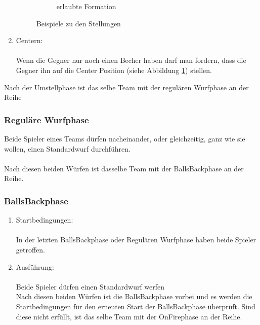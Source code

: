 \documentclass[a5paper, 12pt]{book}
\begin{document}
\begin{enumerate}[(1)]
\begin{figure}[h!]
\begin{subfigure}[b]{0.434\textwidth}
         \caption{erlaubte Formation}
     \end{subfigure}
        \caption{Beispiele zu den Stellungen}
        \label{fig:three graphs}
\end{figure}
\item
    Centern: \\\\
    Wenn die Gegner nur noch einen Becher haben darf man fordern, dass die Gegner ihn auf die Center Position (siehe Abbildung \ref{fig:three graphs}) stellen. 
\end{enumerate}
Nach der Umstellphase ist das selbe Team mit der regulären Wurfphase an der Reihe
\subsubsection{Reguläre Wurfphase} \label{reguläreWurfphase}
Beide Spieler eines Teams dürfen nacheinander, oder gleichzeitig, ganz wie sie wollen, einen Standardwurf durchführen.\\\\ Nach diesen beiden Würfen ist dasselbe Team mit der BallsBackphase an der Reihe.
\subsubsection{BallsBackphase}\label{ballsbackphase}
\begin{enumerate}[(1)]
    \item Startbedingungen:\\\\
    In der letzten BallsBackphase oder Regulären Wurfphase haben beide Spieler getroffen.
    \item Ausführung:\\\\
    Beide Spieler dürfen einen Standardwurf werfen\\
Nach diesen beiden Würfen ist die BallsBackphase vorbei und es werden die Startbedingungen für den erneuten Start der BallsBackphase überprüft. Sind diese nicht erfüllt, ist das selbe Team mit der OnFirephase an der Reihe.

\end{enumerate}
\end{document}
